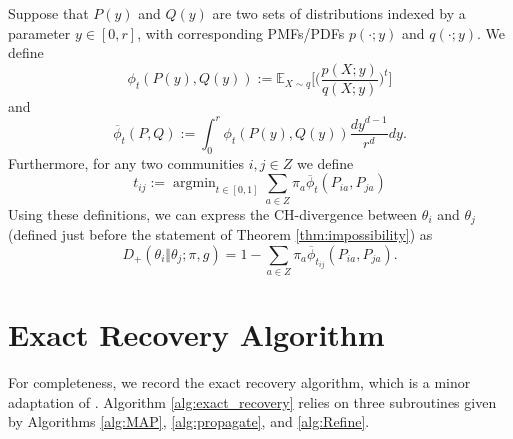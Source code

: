 \documentclass{article}
\DeclareMathOperator*{\argmin}{argmin}
\newcommand{\E}{\mathbb{E}}
\newcommand{\1}{\mathbbm{1}}
\theoremstyle{definition}
\theoremstyle{plain}
\begin{document}
Suppose that $P(y)$ and $Q(y)$ are two sets of distributions indexed by a parameter $y \in [0, r]$, with corresponding PMFs/PDFs $p(\cdot; y)$ and $q(\cdot; y)$. We define
\begin{equation*}
    \phi_t(P(y), Q(y)) := \E_{X \sim q} \bigg[\bigg(\frac{p(X;y)}{q(X;y)}\bigg)^t\bigg]
\end{equation*}
and 
\begin{equation*}
    \overline{\phi}_t(P, Q) := \int_0^r \phi_t(P(y),Q(y) ) \frac{dy^{d-1}}{r^d} dy.
\end{equation*}
Furthermore, for any two communities $i, j \in Z$ we define 
\begin{equation}
\label{def:t_ij}
    t_{ij} := \argmin_{t \in [0, 1]} \sum_{a \in Z} \pi_a \overline{\phi}_t(P_{ia}, P_{ja})
\end{equation}
Using these definitions, we can express the CH-divergence between $\theta_i$ and $\theta_j$ (defined just before the statement of Theorem \ref{thm:impossibility}) as 
\begin{equation}
\label{eq;CH_divergence_alternate}
D_+(\theta_i \Vert \theta_j; \pi, g) = 1 - \sum_{a \in Z} \pi_a \overline{\phi}_{t_{ij}}(P_{ia}, P_{ja}).
\end{equation}


\FloatBarrier
\section{Exact Recovery Algorithm}
\label{appx:full_exact_recovery_algorithm}
For completeness, we record the exact recovery algorithm, which is a minor adaptation of \cite{Gaudio+2025}. Algorithm \ref{alg:exact_recovery} relies on three subroutines given by Algorithms \ref{alg:MAP}, \ref{alg:propagate}, and \ref{alg:Refine}.
\end{document}
